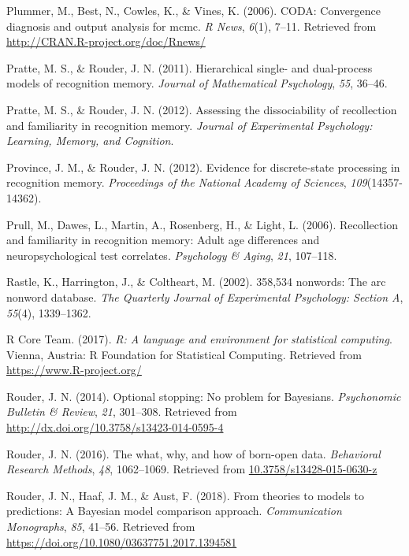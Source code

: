 \documentclass[english,,man]{apa6}
\begin{document}
\leavevmode\hypertarget{ref-R-coda}{}%
Plummer, M., Best, N., Cowles, K., \& Vines, K. (2006). CODA: Convergence diagnosis and output analysis for mcmc. \emph{R News}, \emph{6}(1), 7--11. Retrieved from \url{http://CRAN.R-project.org/doc/Rnews/}

\leavevmode\hypertarget{ref-Pratte:Rouder:2011}{}%
Pratte, M. S., \& Rouder, J. N. (2011). Hierarchical single- and dual-process models of recognition memory. \emph{Journal of Mathematical Psychology}, \emph{55}, 36--46.

\leavevmode\hypertarget{ref-Pratte:Rouder:2012}{}%
Pratte, M. S., \& Rouder, J. N. (2012). Assessing the dissociability of recollection and familiarity in recognition memory. \emph{Journal of Experimental Psychology: Learning, Memory, and Cognition}.

\leavevmode\hypertarget{ref-Province:Rouder:2012}{}%
Province, J. M., \& Rouder, J. N. (2012). Evidence for discrete-state processing in recognition memory. \emph{Proceedings of the National Academy of Sciences}, \emph{109}(14357-14362).

\leavevmode\hypertarget{ref-Prull:etal:2006}{}%
Prull, M., Dawes, L., Martin, A., Rosenberg, H., \& Light, L. (2006). Recollection and familiarity in recognition memory: Adult age differences and neuropsychological test correlates. \emph{Psychology \& Aging}, \emph{21}, 107--118.

\leavevmode\hypertarget{ref-Rastle:etal:2002}{}%
Rastle, K., Harrington, J., \& Coltheart, M. (2002). 358,534 nonwords: The arc nonword database. \emph{The Quarterly Journal of Experimental Psychology: Section A}, \emph{55}(4), 1339--1362.

\leavevmode\hypertarget{ref-R-base}{}%
R Core Team. (2017). \emph{R: A language and environment for statistical computing}. Vienna, Austria: R Foundation for Statistical Computing. Retrieved from \url{https://www.R-project.org/}

\leavevmode\hypertarget{ref-Rouder:2014}{}%
Rouder, J. N. (2014). Optional stopping: No problem for Bayesians. \emph{Psychonomic Bulletin \& Review}, \emph{21}, 301--308. Retrieved from \url{http://dx.doi.org/10.3758/s13423-014-0595-4}

\leavevmode\hypertarget{ref-Rouder:2016}{}%
Rouder, J. N. (2016). The what, why, and how of born-open data. \emph{Behavioral Research Methods}, \emph{48}, 1062--1069. Retrieved from \url{10.3758/s13428-015-0630-z}

\leavevmode\hypertarget{ref-Rouder:etal:2018}{}%
Rouder, J. N., Haaf, J. M., \& Aust, F. (2018). From theories to models to predictions: A Bayesian model comparison approach. \emph{Communication Monographs}, \emph{85}, 41--56. Retrieved from \url{https://doi.org/10.1080/03637751.2017.1394581}
\end{document}
